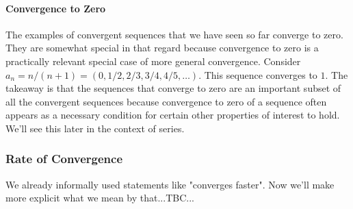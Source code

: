 





\paragraph{Convergence to Zero} The examples of convergent sequences that we have seen so far converge to zero. They are somewhat special in that regard because convergence to zero is a practically relevant special case of more general convergence. Consider $a_n = n/(n+1) = (0,1/2,2/3,3/4,4/5,\ldots)$. This sequence converges to $1$. The takeaway is that the sequences that converge to zero are an important subset of all the convergent sequences because convergence to zero of a sequence often appears as a necessary condition for certain other properties of interest to hold. We'll see this later in the context of series.










\subsubsection{Rate of Convergence}
We already informally used statements like "converges faster". Now we'll make more explicit what we mean by that...TBC...





